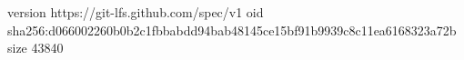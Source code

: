version https://git-lfs.github.com/spec/v1
oid sha256:d066002260b0b2c1fbbabdd94bab48145ce15bf91b9939c8c11ea6168323a72b
size 43840
